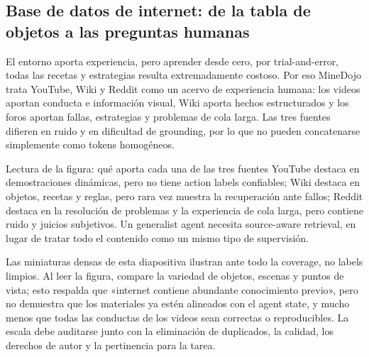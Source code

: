 \subsection{Base de datos de internet: de la tabla de objetos a las preguntas humanas}

El entorno aporta experiencia, pero aprender desde cero, por trial-and-error, todas las recetas y estrategias resulta extremadamente costoso. Por eso MineDojo trata YouTube, Wiki y Reddit como un acervo de experiencia humana: los videos aportan conducta e información visual, Wiki aporta hechos estructurados y los foros aportan fallas, estrategias y problemas de cola larga. Las tres fuentes difieren en ruido y en dificultad de grounding, por lo que no pueden concatenarse simplemente como tokens homogéneos.


\begin{knowledgebox}{Lectura de la figura: qué aporta cada una de las tres fuentes}
YouTube destaca en demostraciones dinámicas, pero no tiene action labels confiables; Wiki destaca en objetos, recetas y reglas, pero rara vez muestra la recuperación ante fallos; Reddit destaca en la resolución de problemas y la experiencia de cola larga, pero contiene ruido y juicios subjetivos. Un generalist agent necesita source-aware retrieval, en lugar de tratar todo el contenido como un mismo tipo de supervisión.
\end{knowledgebox}


Las miniaturas densas de esta diapositiva ilustran ante todo la coverage, no labels limpios. Al leer la figura, compare la variedad de objetos, escenas y puntos de vista; esto respalda que «internet contiene abundante conocimiento previo», pero no demuestra que los materiales ya estén alineados con el agent state, y mucho menos que todas las conductas de los videos sean correctas o reproducibles. La escala debe auditarse junto con la eliminación de duplicados, la calidad, los derechos de autor y la pertinencia para la tarea.


